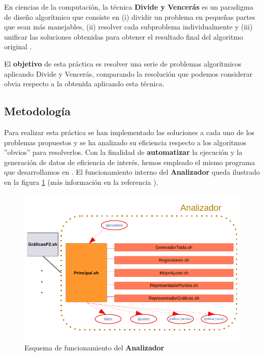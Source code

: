 En ciencias de la computación, la técnica \textbf{Divide y Vencerás} es un paradigma de diseño
algorítmico que consiste en (i) dividir un problema en pequeñas partes que sean más manejables,
(ii) resolver cada subproblema individualmente y (iii) unificar las soluciones obtenidas 
para obtener el resultado final del algoritmo original \cite{Cormen2017}. 

El \textbf{objetivo} de esta práctica es resolver una serie de problemas algorítmicos aplicando
Divide y Vencerás, comparando la resolución que podemos considerar obvia respecto a la obtenida 
aplicando esta técnica. 

\subsection{Metodología}

Para realizar esta práctica se han implementado las soluciones a cada uno de los problemas
propuestos y se ha analizado su eficiencia respecto a los algoritmos ''obvios'' para resolverlos.
Con la finalidad de \textbf{automatizar} la ejecución y la generación de datos de eficiencia
de interés, hemos empleado el mismo programa que desarrollamos en \cite{Rojo2022}.
El funcionamiento interno del \textbf{Analizador} queda ilustrado en la figura 
\ref{fig:analizador} (más información en la referencia \cite{Rojo2022}). 

\begin{figure}[h]
    \centering
    \includegraphics[scale=0.67]{img/esquema_graphkiller.pdf}
    \caption{Esquema de funcionamiento del \textbf{Analizador} \cite{Rojo2022}}
    \label{fig:analizador}
\end{figure}

